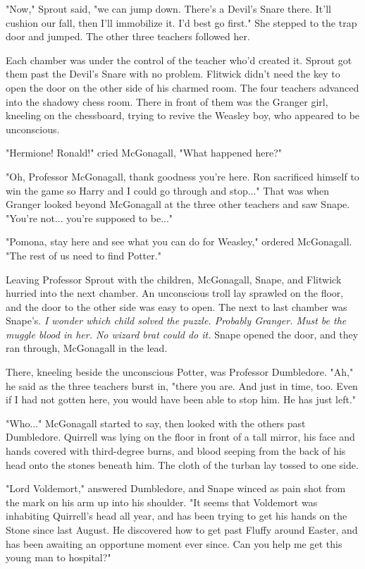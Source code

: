 \documentclass[a4paper,11pt]{article}
\begin{document}
"Now," Sprout said, "we can jump down. There's a Devil's Snare there. It'll cushion our fall, then I'll immobilize it. I'd best go first." She stepped to the trap door and jumped. The other three teachers followed her.

Each chamber was under the control of the teacher who'd created it. Sprout got them past the Devil's Snare with no problem. Flitwick didn't need the key to open the door on the other side of his charmed room. The four teachers advanced into the shadowy chess room. There in front of them was the Granger girl, kneeling on the chessboard, trying to revive the Weasley boy, who appeared to be unconscious.

"Hermione! Ronald!" cried McGonagall, "What happened here?"

"Oh, Professor McGonagall, thank goodness you're here. Ron sacrificed himself to win the game so Harry and I could go through and stop..." That was when Granger looked beyond McGonagall at the three other teachers and saw Snape. "You're not... you're supposed to be..."

"Pomona, stay here and see what you can do for Weasley," ordered McGonagall. "The rest of us need to find Potter."

Leaving Professor Sprout with the children, McGonagall, Snape, and Flitwick hurried into the next chamber. An unconscious troll lay sprawled on the floor, and the door to the other side was easy to open. The next to last chamber was Snape's. \emph{I wonder which child solved the puzzle. Probably Granger. Must be the muggle blood in her. No wizard brat could do it.} Snape opened the door, and they ran through, McGonagall in the lead.

There, kneeling beside the unconscious Potter, was Professor Dumbledore. "Ah," he said as the three teachers burst in, "there you are. And just in time, too. Even if I had not gotten here, you would have been able to stop him. He has just left."

"Who..." McGonagall started to say, then looked with the others past Dumbledore. Quirrell was lying on the floor in front of a tall mirror, his face and hands covered with third-degree burns, and blood seeping from the back of his head onto the stones beneath him. The cloth of the turban lay tossed to one side.

"Lord Voldemort," answered Dumbledore, and Snape winced as pain shot from the mark on his arm up into his shoulder. "It seems that Voldemort was inhabiting Quirrell's head all year, and has been trying to get his hands on the Stone since last August. He discovered how to get past Fluffy around Easter, and has been awaiting an opportune moment ever since. Can you help me get this young man to hospital?"
\end{document}
